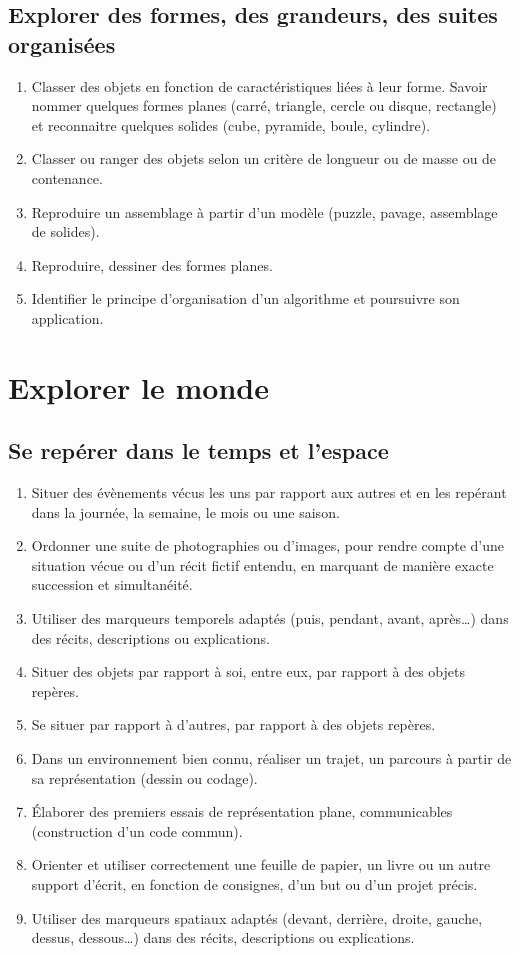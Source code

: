 \subsection{Explorer des formes, des grandeurs, des suites organisées}
\begin{enumerate}
\item Classer des objets en fonction de caractéristiques liées à leur forme. Savoir nommer quelques formes planes (carré, triangle, cercle ou disque, rectangle) et reconnaitre quelques solides (cube, pyramide, boule, cylindre).
\item Classer ou ranger des objets selon un critère de longueur ou de masse ou de contenance.
\item Reproduire un assemblage à partir d’un modèle (puzzle, pavage, assemblage de solides).
\item Reproduire, dessiner des formes planes.
\item Identifier le principe d’organisation d’un algorithme et poursuivre son application. 
\end{enumerate}

\section{Explorer le monde}
\subsection{Se repérer dans le temps et l’espace}
\begin{enumerate}
\item Situer des évènements vécus les uns par rapport aux autres et en les repérant dans la journée, la semaine, le mois ou une saison. 
\item Ordonner une suite de photographies ou d’images, pour rendre compte d’une situation vécue ou d’un récit fictif entendu, en marquant de manière exacte succession et simultanéité.
\item Utiliser des marqueurs temporels adaptés (puis, pendant, avant, après\dots) dans des récits, descriptions ou explications.
\item Situer des objets par rapport à soi, entre eux, par rapport à des objets repères.
\item Se situer par rapport à d’autres, par rapport à des objets repères.
\item Dans un environnement bien connu, réaliser un trajet, un parcours à partir de sa représentation (dessin ou codage). 
\item Élaborer des premiers essais de représentation plane, communicables (construction d’un code commun).
\item Orienter et utiliser correctement une feuille de papier, un livre ou un autre support d’écrit, en fonction de consignes, d’un but ou d’un projet précis.
\item Utiliser des marqueurs spatiaux adaptés (devant, derrière, droite, gauche, dessus, dessous\dots) dans des récits, descriptions ou explications.
\end{enumerate}

